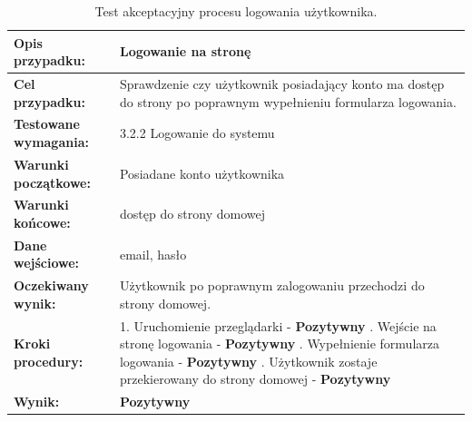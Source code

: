 \begin{table}[ht]
\centering
\begin{tabularx}{\textwidth}{|>{\raggedright\arraybackslash}p{}|X|}
    \hline
    \textbf{Opis przypadku:} & Logowanie na stronę \\
    \hline
    \textbf{Cel przypadku:} & Sprawdzenie czy użytkownik posiadający konto ma dostęp do strony po poprawnym wypełnieniu formularza logowania. \\
    \hline
    \textbf{Testowane wymagania:} & 3.2.2 Logowanie do systemu \\
    \hline
    \textbf{Warunki początkowe:} & Posiadane konto użytkownika \\
    \hline
    \textbf{Warunki końcowe:} & dostęp do strony domowej \\
    \hline
    \textbf{Dane wejściowe:} & email, hasło \\
    \hline
    \textbf{Oczekiwany wynik:} & Użytkownik po poprawnym zalogowaniu przechodzi do strony domowej. \\
    \hline
    \textbf{Kroki procedury:} &
        1. Uruchomienie przeglądarki - \textbf{Pozytywny} \newline
        2. Wejście na stronę logowania - \textbf{Pozytywny} \newline
        3. Wypełnienie formularza logowania - \textbf{Pozytywny} \newline
        4. Użytkownik zostaje przekierowany do strony domowej - \textbf{Pozytywny} \\
    \hline
    \textbf{Wynik:} & \textbf{Pozytywny} \\
    \hline
\end{tabularx}
    \caption{Test akceptacyjny procesu logowania użytkownika.}
\end{table}


